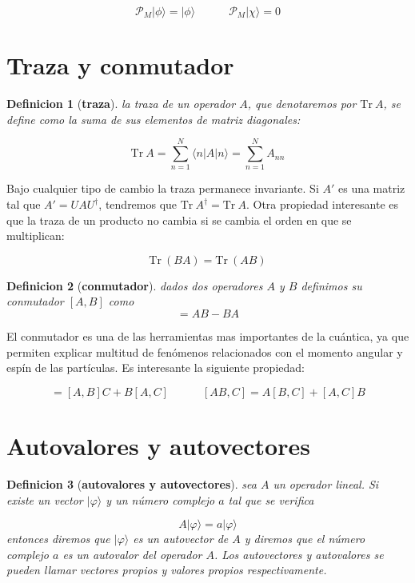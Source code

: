 \documentclass[12pt,a4paper]{book}
\numberwithin{equation}{chapter}
\numberwithin{figure}{chapter}
\newcommand{\tquad}{\quad \quad \quad}
\newcommand{\Tr}{\mathrm{Tr} \ }
\newtheorem{definition}{Definicion}[section]
\begin{document}
\begin{equation}
\mathcal{P}_M | \phi \rangle = | \phi \rangle \tquad \mathcal{P}_M | \chi \rangle = 0
\end{equation}

\section{Traza y conmutador}

\begin{definition}[\textbf{traza}]
la traza de un operador $A$, que denotaremos por $\Tr A$, se define como la suma de sus elementos de matriz diagonales:

\begin{equation}
\Tr A = \sum_{n=1}^N \langle n | A | n \rangle = \sum_{n=1}^N A_{nn}
\end{equation}
\end{definition}

Bajo cualquier tipo de cambio la traza permanece invariante. Si $A'$ es una matriz tal que $A' = UAU^\dagger$, tendremos que $\Tr A^\dagger = \Tr A$. Otra propiedad interesante es que la traza de un producto no cambia si se cambia el orden en que se multiplican:

\begin{equation}
\Tr (BA) = \Tr (AB)
\end{equation}

\begin{definition}[\textbf{conmutador}] 
dados dos operadores $A$ y $B$ definimos su conmutador $[A,B]$ como 
\begin{equation}
[A,B] = A B - B A
\end{equation}
\end{definition}

El conmutador es una de las herramientas mas importantes de la cuántica, ya que permiten explicar multitud de fenómenos relacionados con el momento angular y espín de las partículas. Es interesante la siguiente propiedad:

\begin{equation}
[A,BC] = [A,B]C + B[A,C] \tquad [AB,C] = A[B,C] + [A,C]B
\end{equation} 

\section{Autovalores y autovectores}

\begin{definition}[\textbf{autovalores y autovectores}]
sea $A$ un operador lineal. Si existe un vector $| \varphi \rangle$ y un número complejo $a$ tal que se verifica 

\begin{equation}
A | \varphi \rangle = a | \varphi \rangle
\end{equation}
entonces diremos que $| \varphi \rangle$ es un autovector de $A$ y diremos que el número complejo $a$ es un autovalor del operador $A$. Los autovectores y autovalores se pueden llamar vectores propios y valores propios respectivamente. 
\end{definition}
\end{document}
